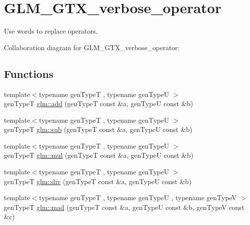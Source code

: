 \hypertarget{group__gtx__verbose__operator}{}\section{G\+L\+M\+\_\+\+G\+T\+X\+\_\+verbose\+\_\+operator}
\label{group__gtx__verbose__operator}


Use words to replace operators.  


Collaboration diagram for G\+L\+M\+\_\+\+G\+T\+X\+\_\+verbose\+\_\+operator\+:
\subsection*{Functions}
\begin{DoxyCompactItemize}
\item 
{\footnotesize template$<$typename gen\+Type\+T , typename gen\+Type\+U $>$ }\\gen\+Type\+T \hyperlink{group__gtx__verbose__operator_ga5d32b6e43b41e5f630d2dc41c4e36094}{glm\+::add} (gen\+Type\+T const \&a, gen\+Type\+U const \&b)
\item 
{\footnotesize template$<$typename gen\+Type\+T , typename gen\+Type\+U $>$ }\\gen\+Type\+T \hyperlink{group__gtx__verbose__operator_ga9ace56e6e27f92d73027da7e1025d27e}{glm\+::sub} (gen\+Type\+T const \&a, gen\+Type\+U const \&b)
\item 
{\footnotesize template$<$typename gen\+Type\+T , typename gen\+Type\+U $>$ }\\gen\+Type\+T \hyperlink{group__gtx__verbose__operator_gaffbfa2a8416cf5677e677bcfc393933a}{glm\+::mul} (gen\+Type\+T const \&a, gen\+Type\+U const \&b)
\item 
{\footnotesize template$<$typename gen\+Type\+T , typename gen\+Type\+U $>$ }\\gen\+Type\+T \hyperlink{group__gtx__verbose__operator_gae39cb52e643ec143a30b641d062a50b9}{glm\+::div} (gen\+Type\+T const \&a, gen\+Type\+U const \&b)
\item 
{\footnotesize template$<$typename gen\+Type\+T , typename gen\+Type\+U , typename gen\+Type\+V $>$ }\\gen\+Type\+T \hyperlink{group__gtx__verbose__operator_ga757b5f103400c11aa4da962d9edb40eb}{glm\+::mad} (gen\+Type\+T const \&a, gen\+Type\+U const \&b, gen\+Type\+V const \&c)
\end{DoxyCompactItemize}


